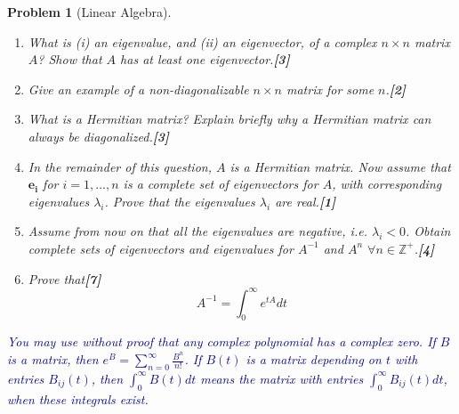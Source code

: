 \documentclass[a4paper]{article}
\theoremstyle{new}
\newtheorem{qns}{Problem}[section]
\begin{document}
\begin{qns}[Linear Algebra]\leavevmode
\begin{enumerate}[label=(\alph*)]
    \item What is (i) an eigenvalue, and (ii) an eigenvector, of a complex $n\times n$ matrix $A$? Show that $A$ has at least one eigenvector.\hfill \textbf{[3]}
    \item Give an example of a non-diagonalizable $n\times n$ matrix for some $n$.\hfill \textbf{[2]}
    \item What is a Hermitian matrix? Explain briefly why a Hermitian matrix can always be diagonalized.\hfill \textbf{[3]}
    \item In the remainder of this question, $A$ is a Hermitian matrix. Now assume that $\mathbf{e_i}$ for $i=1,...,n$ is a complete set of eigenvectors for $A$, with corresponding eigenvalues $\lambda_i$. Prove that the eigenvalues $\lambda_i$ are real.\hfill \textbf{[1]}
    \item Assume from now on that all the eigenvalues are negative, i.e. $\lambda_i<0$. Obtain complete sets of eigenvectors and eigenvalues for $A^{-1}$ and $A^n$ $\forall n\in\mathbb{Z}^+$.\hfill \textbf{[4]}
    \item Prove that\hfill \textbf{[7]}
$$A^{-1}=\int_0^\infty e^{tA}dt$$
\end{enumerate}
\begin{mdframed}
\textcolor{darkblue}{You may use without proof that any complex polynomial has a complex zero. If $B$ is a matrix, then $e^B=\sum_{n=0}^\infty\frac{B^n}{n!}$. If $B(t)$ is a matrix depending on $t$ with entries $B_{ij}(t)$, then $\int_0^\infty B(t)dt$ means the matrix with entries $\int_0^\infty B_{ij}(t)dt$, when these integrals exist.}
\end{mdframed}
\end{qns}
\end{document}
